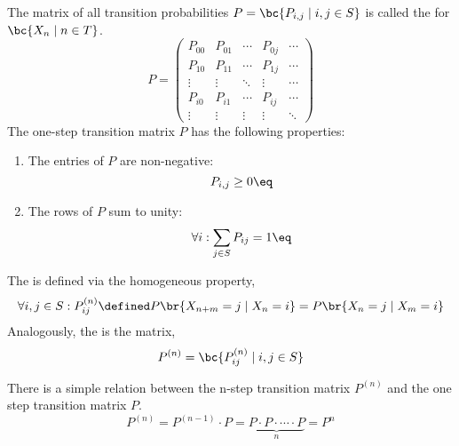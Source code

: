 \documentclass{article}
\begin{document}
The matrix of all transition probabilities $P = \bc{P_{i,j} \mid i,j \in S}$ is called the  for $\bc{X_{n} \mid n \in T}$.
\[ P = \begin{pmatrix}
P_{00} & P_{01} & \cdots & P_{0j} & \cdots \\
P_{10} & P_{11} & \cdots & P_{1j} & \cdots \\
\vdots & \vdots & \ddots & \vdots & \cdots \\
P_{i0} & P_{i1} & \cdots & P_{ij} & \cdots \\
\vdots & \vdots & \vdots & \vdots & \ddots
\end{pmatrix} \]
The one-step transition matrix $P$ has the following properties:
\begin{enumerate}
    \item The entries of $P$ are non-negative:
    \[ P_{i,j} \geq 0 \eq \label{eq:trans_positive_entries} \]
    \item The rows of $P$ sum to unity:
    \[ \forall i : \sum_{j \in S} P_{ij} = 1 \eq \label{eq:trans_row_sum} \]
\end{enumerate}

The  is defined via the homogeneous property,
\[ \forall i,j \in S : P_{ij}^{(n)} \defined P\br{X_{n+m} = j \mid X_{n} = i} = P\br{X_{n} = j \mid X_{m} = i} \]
Analogously, the  is the matrix,
\[ P^{(n)} = \bc{P_{ij}^{(n)} \mid i, j \in S} \]

\begin{theorem}
There is a simple relation between the n-step transition matrix $P^{(n)}$ and the one step transition matrix $P$.
\[ P^{(n)} = P^{(n-1)} \cdot P = \underbrace{P \cdot P \cdot \cdots \cdot P}_{n} = P^n \]
\end{theorem}
\end{document}
